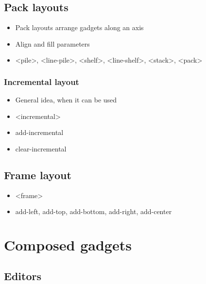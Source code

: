 \documentclass{book}
\begin{document}
\subsection{Pack layouts}

\begin{itemize}

\item Pack layouts arrange gadgets along an axis

\item Align and fill parameters

\item <pile>, <line-pile>, <shelf>, <line-shelf>, <stack>, <pack>

\end{itemize}

\subsubsection{Incremental layout}

\begin{itemize}

\item General idea, when it can be used

\item <incremental>

\item add-incremental

\item clear-incremental

\end{itemize}

\subsection{Frame layout}

\begin{itemize}

\item <frame>

\item add-left, add-top, add-bottom, add-right, add-center

\end{itemize}

\section{Composed gadgets}

\subsection{Editors}
\end{document}
